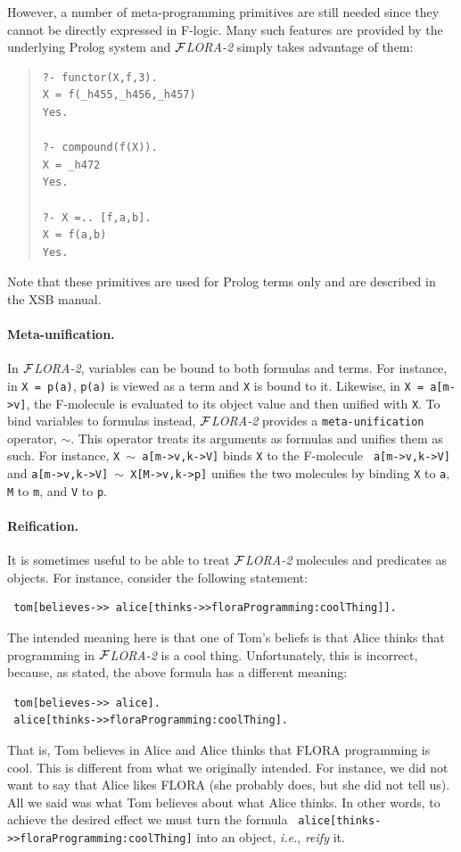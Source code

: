 \documentclass[11pt]{article}
\newcommand{\FLORA}{{\mbox{${\cal F}${\small\it LORA}\rm\emph{-2}}}\xspace}
\newcommand{\fl}{\mbox{F-logic}\xspace}
\begin{document}
However, a number of meta-programming primitives are still needed
since they cannot be directly expressed in \fl. Many such features are
provided by the underlying Prolog system and \FLORA simply takes advantage of
them: 
\begin{quote}
\begin{verbatim}
?- functor(X,f,3).
X = f(_h455,_h456,_h457)
Yes.

?- compound(f(X)).
X = _h472
Yes.

?- X =.. [f,a,b].
X = f(a,b)
Yes.
\end{verbatim}
\end{quote}
Note that these primitives are used for Prolog terms only and
are described in the XSB manual.

\paragraph{Meta-unification.}
In \FLORA, variables can be bound to both formulas and terms. For instance,
in {\tt X = p(a)}, {\tt p(a)} is viewed as a term and {\tt X} is bound to
it. Likewise, in {\tt X = a[m->v]}, the F-molecule is evaluated to its
object value and then unified with {\tt X}. To bind variables to formulas
instead, \FLORA provides a {\tt meta-unification} operator, $\sim$.  This
operator treats its arguments as formulas and unifies them as such. For
instance, {\tt X $\sim$ a[m->v,k->V]} binds {\tt X} to the F-molecule {\tt
  a[m->v,k->V]} and {\tt a[m->v,k->V] $\sim$ X[M->v,k->p]} unifies the two
molecules by binding {\tt X} to {\tt a}, {\tt M} to {\tt m}, and {\tt V} to
{\tt p}.

\paragraph{Reification.}
It is sometimes useful to be able to treat \FLORA molecules and predicates
as objects. For instance, consider the following statement:
\begin{verbatim}
 tom[believes->> alice[thinks->>floraProgramming:coolThing]].
\end{verbatim}
The intended meaning here is that one of Tom's beliefs is that Alice
thinks that programming in \FLORA is a cool thing. Unfortunately, this is
incorrect, because, as stated, the above formula has a different meaning:
\begin{verbatim}
 tom[believes->> alice].
 alice[thinks->>floraProgramming:coolThing].  
\end{verbatim}
That is, Tom believes in Alice and Alice thinks that FLORA programming is
cool. This is different from what we originally intended. For instance, we
did not want to say that Alice likes FLORA (she probably does, but she did
not tell us). All we said was what Tom believes about what Alice thinks. In
other words, to achieve the desired effect we must turn the formula {\tt
  alice[thinks->>floraProgramming:coolThing]} into an object, {\it i.e.},
\emph{reify} it.
\end{document}
